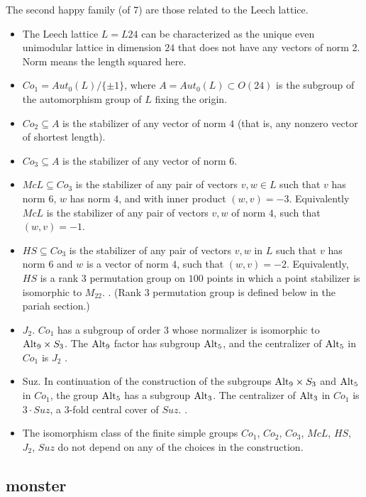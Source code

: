 The second happy family (of 7) are those related to the Leech lattice.
\begin{itemize}
\item The Leech lattice $L=L24$ can be characterized as the unique
  even unimodular lattice in dimension $24$ that does not have any
  vectors of norm 2.  Norm means the length squared here.
\item $Co_1 = Aut_0(L)/\{\pm 1\}$, where $A=Aut_0(L) \subset O(24)$ is
  the subgroup of the automorphism group of $L$ fixing the origin.
\item $Co_2 \subseteq A$ is the stabilizer of any vector of norm $4$
  (that is, any nonzero vector of shortest length).
\item $Co_3 \subseteq  A$ is the stabilizer of any vector of norm $6$.
\item $McL \subseteq Co_3$ is the stabilizer of any pair of vectors
  $v,w\in L$ such that $v$ has norm $6$, $w$ has norm $4$, and with
  inner product $(w,v) = -3$.  Equivalently $McL$ is the stabilizer of
  any pair of vectors $v,w$ of norm $4$, such that $(w,v) = -1$.
\item $HS \subseteq Co_3$ is the stabilizer of any pair of vectors
  $v,w$ in $L$ such that $v$ has norm $6$ and $w$ is a vector of norm
  $4$, such that $(w,v) = -2$.  Equivalently, $HS$ is a rank $3$
  permutation group on $100$ points in which a point stabilizer is
  isomorphic to $M_{22}$. \cite[p.116]{robert1998twelve}.  (Rank $3$
  permutation group is defined below in the pariah section.)
\item $J_2$.  $Co_1$ has a subgroup of order $3$ whose normalizer is
  isomorphic to $\text{Alt}_9 \times S_3$.  The $\text{Alt}_9$ factor has subgroup
  $\text{Alt}_5$, and the centralizer of $\text{Alt}_5$ in $Co_1$ is $J_2$
  \cite[p.218]{wilson2009finite}.
\item Suz.  In continuation of the construction of the subgroups
  $\text{Alt}_9 \times S_3$ and $\text{Alt}_5$ in $Co_1$, the group $\text{Alt}_5$ has a
  subgroup $\text{Alt}_3$.  The centralizer of $\text{Alt}_3$ in $Co_1$ is $3\cdot
  Suz$, a $3$-fold central cover of $Suz$.
  \cite[p.218]{wilson2009finite}.
\item The isomorphism class of the finite simple groups $Co_1$,
  $Co_2$, $Co_3$, $McL$, $HS$, $J_2$, $Suz$ do not depend on any of
  the choices in the construction.
\end{itemize}

\subsection{monster}


